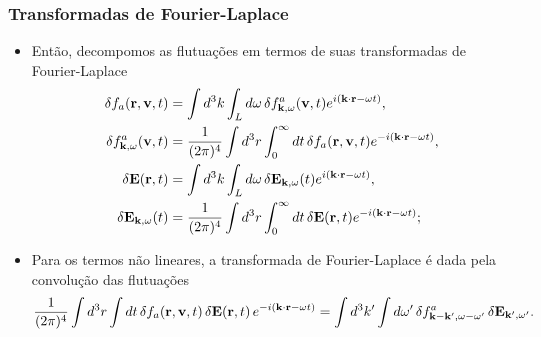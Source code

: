 \documentclass[10pt,aspectratio=1610,lualatex]{beamer}
\begin{document}
\begin{frame}
  \frametitle{Transformadas de Fourier-Laplace}
  \begin{itemize}
    \item Então, decompomos as flutuações em termos de suas
      transformadas de Fourier-Laplace
    \begin{equation*}
      \begin{split}
	\delta f_a({\bf r}, {\bf v},t)
	&=\int d^3k \int_L d \omega\,\delta f^a_{{\bf k}, \omega}({\bf v}, t)
	e^{i({\bf k \cdot r}-\omega t)},\\
	\delta f^a_{{\bf k}, \omega}({\bf v}, t)
	&=\frac{1}{(2 \pi)^4}\int d^3r \int_0^{\infty} dt\,
	\delta f_a({\bf r},{\bf v},t) e^{-i({\bf k \cdot r} - \omega t)},\\
	\delta {\bf E}({\bf r},t)
	&=\int d^3k \int_L d\omega\, \delta{\bf E}_{{\bf k},\omega}(t)
	e^{i({\bf k \cdot r}-\omega t)},\\
	\delta{\bf E}_{{\bf k},\omega}(t)
	&=\frac{1}{(2 \pi)^4}\int d^3r\int_0^{\infty} dt\,
	\delta{\bf  E}({\bf   r},t) e^{-i({\bf k \cdot r} - \omega t)};
      \end{split}
    \end{equation*}
    \vspace{-0.2cm}
    \pause
  \item Para os termos não lineares, a transformada de Fourier-Laplace
    é dada pela convolução das flutuações
    \begin{equation*}
      \frac{1}{(2\pi)^4}\int d^3r \int dt\,
      \delta f_a({\bf r}, {\bf v},t)\,
      \delta{\bf E}({\bf r},t)\, e^{-i({\bf k \cdot r}-\omega t)}
      =\int d^3k' \int d\omega '\,\delta f^a_{{\bf k-k'},\omega-\omega '}\,
      \delta{\bf E}_{{\bf k'},\omega '}.
    \end{equation*}
  \end{itemize}
\end{frame}
\end{document}
